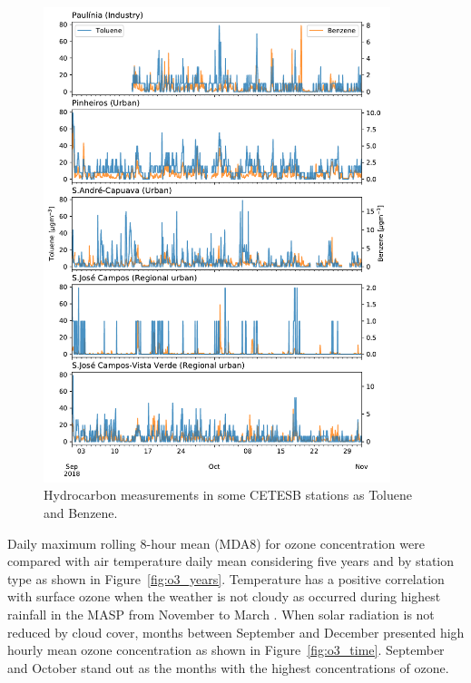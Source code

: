 	\begin{figure}[hbt]
	\begin{center}
		\includegraphics[width=0.9\textwidth]{fig/HC_CETESB_sep_oct2018.pdf}
	\end{center}
  		\caption{Hydrocarbon measurements in some CETESB stations as Toluene and Benzene.}
  		\label{fig:HC_obs}
	\end{figure}


Daily maximum rolling 8-hour mean (MDA8) for ozone concentration were compared with air temperature daily mean considering five years and by station type as shown in Figure~\ref{fig:o3_years}.
Temperature has a positive correlation with surface ozone when the weather is not cloudy as occurred during highest rainfall in the MASP from November to March \citep{Lima2018}.
When solar radiation is not reduced by cloud cover, months between September and December presented high hourly mean ozone concentration as shown in Figure~\ref{fig:o3_time}.
September and October stand out as the months with the highest concentrations of ozone.

